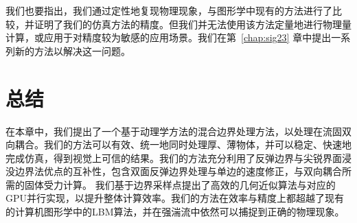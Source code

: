 我们也要指出，我们通过定性地复现物理现象，与图形学中现有的方法进行了比较，并证明了我们的仿真方法的精度。但我们并无法使用该方法定量地进行物理量计算，或应用于对精度较为敏感的应用场景。我们在第~\ref{chap:sig23} 章中提出一系列新的方法以解决这一问题。

\section{总结}
在本章中，我们提出了一个基于动理学方法的混合边界处理方法，以处理在流固双向耦合。我们的方法可以有效、统一地同时处理厚、薄物体，并可以稳定、快速地完成仿真，得到视觉上可信的结果。我们的方法充分利用了反弹边界与尖锐界面浸没边界法优点的互补性，包含双面反弹边界处理与单边的速度修正，与双向耦合所需的固体受力计算。
我们基于边界采样点提出了高效的几何近似算法与对应的GPU并行实现，以提升整体计算效率。我们的方法在效率与精度上都超越了现有的计算机图形学中的LBM算法，并在强湍流中依然可以捕捉到正确的物理现象。
